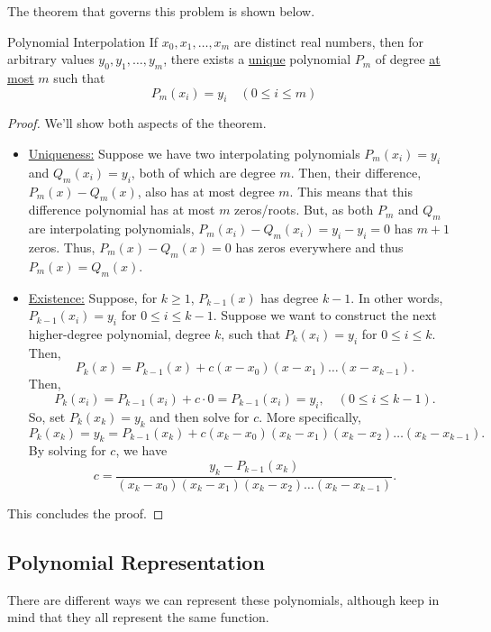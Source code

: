 \documentclass[letterpaper]{article}
\begin{document}
The theorem that governs this problem is shown below. 
\begin{theorem}{Polynomial Interpolation}{}
    If $x_0, x_1, \hdots, x_m$ are distinct real numbers, then for arbitrary values $y_0, y_1, \hdots, y_m$, there exists a \underline{unique} polynomial $P_{m}$ of degree \underline{at most} $m$ such that \[P_{m}(x_i) = y_i \quad (0 \leq i \leq m)\]
\end{theorem}

\begin{proof}
    We'll show both aspects of the theorem. 
    \begin{itemize}
        \item \underline{Uniqueness:} Suppose we have two interpolating polynomials $P_{m}(x_i) = y_i$ and $Q_{m}(x_i) = y_i$, both of which are degree $m$. Then, their difference, $P_{m}(x) - Q_{m}(x)$, also has at most degree $m$. This means that this difference polynomial has at most $m$ zeros/roots. But, as both $P_m$ and $Q_m$ are interpolating polynomials, $P_{m}(x_i) - Q_{m}(x_i) = y_i - y_i = 0$ has $m + 1$ zeros. Thus, $P_m(x) - Q_m(x) = 0$ has zeros everywhere and thus $P_m(x) = Q_m(x)$. 
        \item \underline{Existence:} Suppose, for $k \geq 1$, $P_{k - 1}(x)$ has degree $k - 1$. In other words, $P_{k - 1}(x_i) = y_i$ for $0 \leq i \leq k - 1$. Suppose we want to construct the next higher-degree polynomial, degree $k$, such that $P_{k}(x_i) = y_i$ for $0 \leq i \leq k$. Then, \[P_{k}(x) = P_{k - 1}(x) + c(x - x_0)(x - x_1) \hdots (x - x_{k - 1}).\] 
        Then, \[P_{k}(x_i) = P_{k - 1}(x_i) + c \cdot 0 = P_{k - 1}(x_i) = y_i, \quad (0 \leq i \leq k - 1).\]
        So, set $P_{k}(x_k) = y_k$ and then solve for $c$. More specifically, 
        \[P_{k}(x_k) = y_k = P_{k - 1}(x_k) + c(x_k - x_0)(x_k - x_1)(x_k - x_2) \hdots (x_k - x_{k - 1}).\]
        By solving for $c$, we have 
        \[c = \frac{y_k - P_{k - 1}(x_k)}{(x_k - x_0)(x_k - x_1)(x_k - x_2) \hdots (x_k - x_{k - 1})}.\]
    \end{itemize}
    This concludes the proof.
\end{proof}

\subsection{Polynomial Representation}
There are different ways we can represent these polynomials, although keep in mind that they all represent the same function. 
\end{document}
